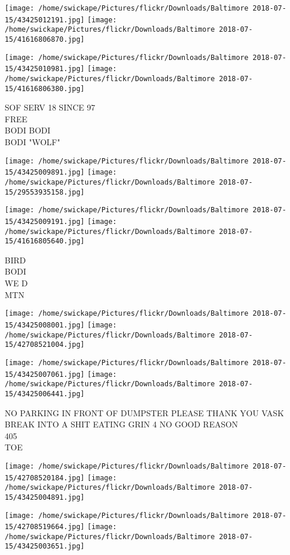 \documentclass[10pt,letterpaper]{article}
\begin{document}
\texttt{[image: /home/swickape/Pictures/flickr/Downloads/Baltimore 2018-07-15/43425012191.jpg]}
\texttt{[image: /home/swickape/Pictures/flickr/Downloads/Baltimore 2018-07-15/41616806870.jpg]}

\texttt{[image: /home/swickape/Pictures/flickr/Downloads/Baltimore 2018-07-15/43425010981.jpg]}
\texttt{[image: /home/swickape/Pictures/flickr/Downloads/Baltimore 2018-07-15/41616806380.jpg]}

SOF SERV 18 SINCE 97\\
FREE\\
BODI BODI\\
BODI "WOLF"
\pagebreak

\texttt{[image: /home/swickape/Pictures/flickr/Downloads/Baltimore 2018-07-15/43425009891.jpg]}
\texttt{[image: /home/swickape/Pictures/flickr/Downloads/Baltimore 2018-07-15/29553935158.jpg]}

\texttt{[image: /home/swickape/Pictures/flickr/Downloads/Baltimore 2018-07-15/43425009191.jpg]}
\texttt{[image: /home/swickape/Pictures/flickr/Downloads/Baltimore 2018-07-15/41616805640.jpg]}

BIRD\\
BODI\\
WE D\\
MTN
\pagebreak

\texttt{[image: /home/swickape/Pictures/flickr/Downloads/Baltimore 2018-07-15/43425008001.jpg]}
\texttt{[image: /home/swickape/Pictures/flickr/Downloads/Baltimore 2018-07-15/42708521004.jpg]}

\texttt{[image: /home/swickape/Pictures/flickr/Downloads/Baltimore 2018-07-15/43425007061.jpg]}
\texttt{[image: /home/swickape/Pictures/flickr/Downloads/Baltimore 2018-07-15/43425006441.jpg]}

NO PARKING IN FRONT OF DUMPSTER PLEASE THANK YOU VASK\\
BREAK INTO A SHIT EATING GRIN 4 NO GOOD REASON\\
405\\
TOE
\pagebreak

\texttt{[image: /home/swickape/Pictures/flickr/Downloads/Baltimore 2018-07-15/42708520184.jpg]}
\texttt{[image: /home/swickape/Pictures/flickr/Downloads/Baltimore 2018-07-15/43425004891.jpg]}

\texttt{[image: /home/swickape/Pictures/flickr/Downloads/Baltimore 2018-07-15/42708519664.jpg]}
\texttt{[image: /home/swickape/Pictures/flickr/Downloads/Baltimore 2018-07-15/43425003651.jpg]}
\end{document}
